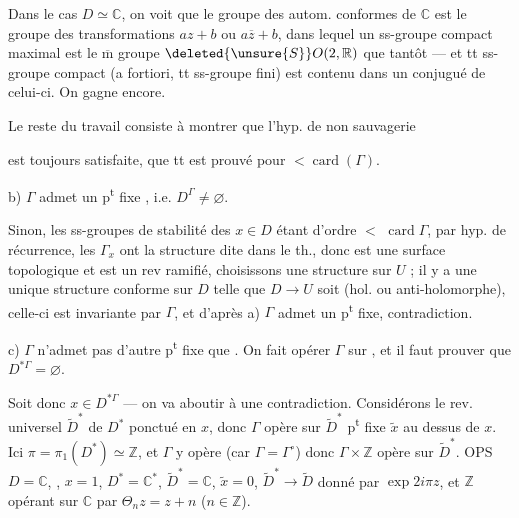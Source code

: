 Dans le cas $D\simeq\mathbb C$, on voit que  le groupe des autom. conformes de $\mathbb C$ est le groupe des transformations $az+b$ ou $a\overline z+b$, dans lequel un ss-groupe compact maximal est le $\overline{\mathrm m}$ groupe $\deleted{\unsure{S}}O(2,\mathbb R)$ que tantôt --- et tt ss-groupe compact (a fortiori, tt ss-groupe fini) est contenu dans un conjugué de celui-ci. On gagne encore.

Le reste du travail consiste  à  montrer que l'hyp. de non sauvagerie


est toujours satisfaite,    que tt est prouvé pour   $<\operatorname{card}(\Gamma)$. 

 b) $\Gamma$ admet un p\textsuperscript{t} fixe , i.e. $D^\Gamma\ne\varnothing$.

Sinon, les ss-groupes de stabilité  des $x\in D$ étant d'ordre $<$  $\operatorname{card}\Gamma$, par hyp. de récurrence, les $\Gamma_x$ ont la structure dite dans le th., donc  est une surface topologique et  est un rev ramifié, choisissons une structure   sur $U$ ; il y a une unique structure conforme sur $D$ telle que $D\longrightarrow U$ soit   (hol. ou anti-holomorphe), celle-ci est invariante par $\Gamma$, et d'après a) $\Gamma$ admet un p\textsuperscript{t} fixe, contradiction.

 c) $\Gamma$ n'admet pas d'autre p\textsuperscript{t} fixe que . On fait opérer $\Gamma$  sur , et il faut prouver que $D^{*\Gamma}=\varnothing$.


Soit donc $x\in D^{*\Gamma}$ --- on va aboutir à une contradiction. Considérons le rev. universel $\widetilde D^*$ de $D^*$ ponctué en $x$,  donc $\Gamma$ opère sur $\widetilde D^*$  p\textsuperscript{t} fixe $\widetilde x$ au dessus de $x$. Ici $\pi=\pi_1(D^*)\simeq\mathbb Z$, et $\Gamma$ y opère  (car $\Gamma=\Gamma^\circ$) donc $\Gamma\times\mathbb Z$ opère sur $\widetilde D^*$. OPS $D=\mathbb C$, , $x=1$, $D^*=\mathbb C^*$, $\widetilde D^*=\mathbb C$, $\widetilde x=0$, $\widetilde D^*\longrightarrow\widetilde D$ donné par $\exp 2i\pi z$,  et $\mathbb Z$ opérant sur $\mathbb C$ par $\Theta_nz=z+n$ ($n\in\mathbb Z$).

